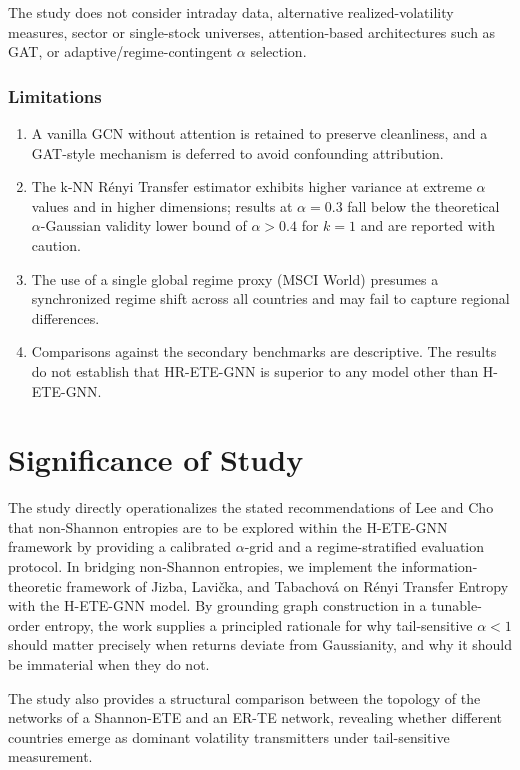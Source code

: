 \documentclass[12pt,oneside]{report}
\begin{document}
The study does not consider intraday data, alternative
realized-volatility measures, sector or single-stock universes,
attention-based architectures such as GAT, or adaptive/regime-contingent
$\alpha$ selection.

\subsubsection*{Limitations}

\begin{enumerate}
  \item A vanilla GCN without attention is retained to preserve
        cleanliness, and a GAT-style mechanism is deferred to avoid
        confounding attribution.
  \item The k-NN Rényi Transfer estimator exhibits higher variance at
        extreme $\alpha$ values and in higher dimensions; results at
        $\alpha = 0.3$ fall below the theoretical $\alpha$-Gaussian
        validity lower bound of $\alpha > 0.4$ for $k = 1$ and are
        reported with caution.
  \item The use of a single global regime proxy (MSCI World) presumes a
        synchronized regime shift across all countries and may fail to
        capture regional differences.
  \item Comparisons against the secondary benchmarks are descriptive. The
        results do not establish that HR-ETE-GNN is superior to any model
        other than H-ETE-GNN.
\end{enumerate}

\section{Significance of Study}

The study directly operationalizes the stated recommendations of Lee and
Cho \cite{lee2025} that non-Shannon entropies are to be explored within
the H-ETE-GNN framework by providing a calibrated $\alpha$-grid and a
regime-stratified evaluation protocol. In bridging non-Shannon
entropies, we implement the information-theoretic framework of Jizba,
Lavička, and Tabachová \cite{jizba2022} on Rényi Transfer Entropy with
the H-ETE-GNN model. By grounding graph construction in a tunable-order
entropy, the work supplies a principled rationale for why tail-sensitive
$\alpha < 1$ should matter precisely when returns deviate from
Gaussianity, and why it should be immaterial when they do not.

The study also provides a structural comparison between the topology of
the networks of a Shannon-ETE and an ER-TE network, revealing whether
different countries emerge as dominant volatility transmitters under
tail-sensitive measurement.
\end{document}
